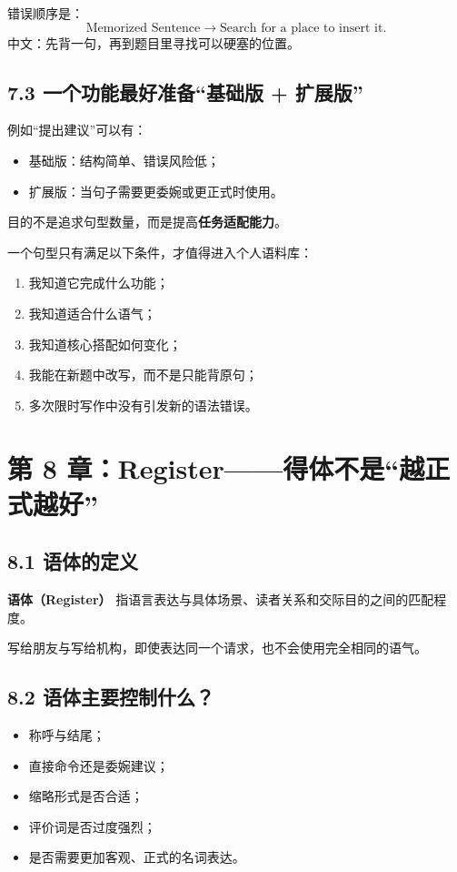 \documentclass[11pt,a4paper]{ctexart}
\newcommand{\kw}[1]{\textbf{#1}}
\newcommand{\term}[2]{\textbf{#1（#2）}}
\begin{document}
错误顺序是：
\[
\text{Memorized Sentence}
\rightarrow
\text{Search for a place to insert it}.
\]
中文：先背一句，再到题目里寻找可以硬塞的位置。

\subsection{7.3 一个功能最好准备“基础版 + 扩展版”}
例如“提出建议”可以有：
\begin{itemize}
  \item 基础版：结构简单、错误风险低；
  \item 扩展版：当句子需要更委婉或更正式时使用。
\end{itemize}

目的不是追求句型数量，而是提高\kw{任务适配能力}。

\begin{method}[语言资源的录入标准]
一个句型只有满足以下条件，才值得进入个人语料库：
\begin{enumerate}
  \item 我知道它完成什么功能；
  \item 我知道适合什么语气；
  \item 我知道核心搭配如何变化；
  \item 我能在新题中改写，而不是只能背原句；
  \item 多次限时写作中没有引发新的语法错误。
\end{enumerate}
\end{method}

\newpage
\section{第 8 章：Register——得体不是“越正式越好”}

\subsection{8.1 语体的定义}
\term{语体}{Register} 指语言表达与具体场景、读者关系和交际目的之间的匹配程度。

写给朋友与写给机构，即使表达同一个请求，也不会使用完全相同的语气。

\subsection{8.2 语体主要控制什么？}
\begin{itemize}
  \item 称呼与结尾；
  \item 直接命令还是委婉建议；
  \item 缩略形式是否合适；
  \item 评价词是否过度强烈；
  \item 是否需要更加客观、正式的名词表达。
\end{itemize}
\end{document}
